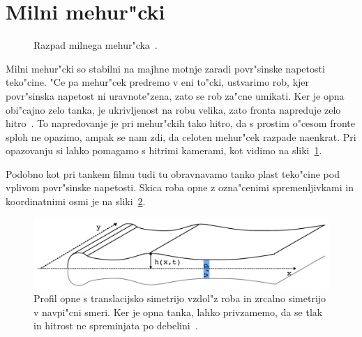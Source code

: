 \documentclass[a4paper,10pt]{article}
\begin{document}
\newpage
\section{Milni mehur"cki}

\begin{figure}[h]
 \centering
{}
\caption{Razpad milnega mehur"cka~\cite{slike-mehurcek}. }
\label{fig:mehurcek-3}
\end{figure}

Milni mehur"cki so stabilni na majhne motnje zaradi povr"sinske napetosti teko"cine. "Ce pa mehur"cek predremo v eni to"cki, ustvarimo rob, kjer povr"sinska napetost ni uravnote"zena, zato se rob za"cne umikati. Ker je opna obi"cajno zelo tanka, je ukrivljenost na robu velika, zato fronta napreduje zelo hitro~\cite{diploma}. To napredovanje je pri mehur"ckih tako hitro, da s prostim o"cesom fronte sploh ne opazimo, ampak se nam zdi, da celoten mehur"cek razpade naenkrat. Pri opazovanju si lahko pomagamo s hitrimi kamerami, kot vidimo na sliki~\ref{fig:mehurcek-3}. 

Podobno kot pri tankem filmu tudi tu obravnavamo tanko plast teko"cine pod vplivom povr"sinske napetosti. Skica roba opne z ozna"cenimi spremenljivkami in koordinatnimi osmi je na sliki~\ref{fig:mehurcek-skica}. 
\begin{figure}[h]
 \centering
\includegraphics[width=.8\textwidth]{./Slike/mehurcek-skica}
\caption{Profil opne s translacijsko simetrijo vzdol"z roba in zrcalno simetrijo v navpi"cni smeri. Ker je opna tanka, lahko privzamemo, da se tlak in hitrost ne spreminjata po debelini~\cite{diploma}. }
\label{fig:mehurcek-skica}
\end{figure}
\end{document}
